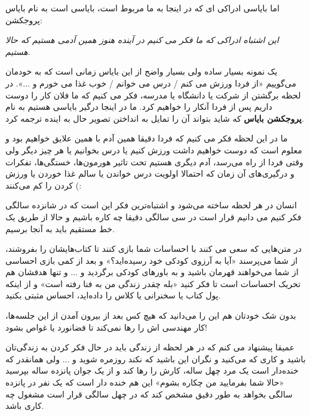 اما بایاسی ادراکی ای که در اینجا به ما مربوط است، بایاسی است به نام بایاس پروجکشن:

\emph{این اشتباه ادراکی که ما فکر می کنیم در آینده هنوز همین آدمی هستیم که حالا هستیم}.

 یک نمونه بسیار ساده ولی بسیار واضح از این بایاس زمانی است که به خودمان می‌گوییم «از فردا ورزش می کنم / درس می خوانم / خوب غذا می خورم و ...». در لحظه برگشتن از شرکت یا دانشگاه یا مدرسه، فکر می کنیم که ما فلان کار را دوست داریم پس از فردا آنکار را خواهیم کرد. ما در اینجا درگیر بایاسی هستیم به نام
\textbf{پروجکشن بایاس}
که شاید بتواند آن را تمایل به انداختن تصویر حال به اینده ترجمه کرد. 

ما در این لحظه فکر می کنیم که فردا دقیقا همین آدم با همین علایق خواهیم بود و معلوم است که دوست خواهیم داشت ورزش کنیم یا درس بخوانیم یا هر چیز دیگر ولی وقتی فردا از راه می‌رسد، آدم دیگری هستیم تحت تاثیر هورمون‌ها، خستگی‌ها، تفکرات و درگیری‌های آن زمان که احتمالا اولویت درس خواندن یا سالم غذا خوردن یا ورزش کردن را کم می‌کنند (:

 انسان در هر لحظه ساخته می‌شود و اشتباه‌ترین فکر این است که در شانزده سالگی فکر کنیم می دانیم قرار است در سی سالگی دقیقا چه کاره باشیم و حالا از طریق یک خط مستقیم باید به آنجا برسیم.

در متن‌هایی که سعی می کنند با احساسات شما بازی کنند تا کتاب‌هایشان را بفروشند، از شما می‌پرسند «آیا به آرزوی کودکی خود رسیده‌اید؟» و بعد از کمی بازی احساسی از شما می‌خواهند قهرمان باشید و به باورهای کودکی برگردید و ... و تنها هدفشان هم تحریک احساسات است تا فکر کنید «بله چقدر زندگی من به فنا رفته است» و از اینکه پول کتاب یا سخنرانی یا کلاس را داده‌اید، احساس مثبتی بکنید.

 بدون شک خودتان هم این را می‌دانید که هیچ کس بعد از بیرون آمدن از این جلسه‌ها، کار مهندسی اش را رها نمی‌کند تا فضانورد یا غواص بشود! 

عمیقا پیشنهاد می کنم که در هر لحظه از زندگی باید در حال فکر کردن به زندگی‌تان باشید و کاری که می‌کنید و نگران این باشید که نکند روزمره شوید و ... ولی همانقدر که خنده‌دار است یک مرد چهل ساله، کارش را رها کند و از یک جوان پانزده ساله بپرسید «حالا شما بفرمایید من چکاره بشوم» این هم خنده دار است که یک نفر در پانزده سالگی بخواهد به طور دقیق مشخص کند که در چهل سالگی قرار است مشغول چه کاری باشد.
